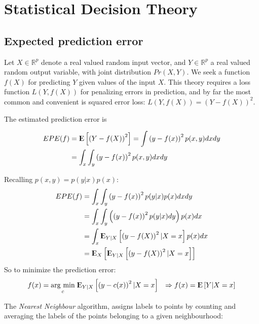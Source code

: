 \documentclass[12pt, letterpaper]{article}
\theoremstyle{definition}
\newcommand{\R}{\mathbb{R}}
\newcommand{\E}{{\rm I\kern-.3em E}}
\newcommand{\argmin}[1]{\underset{#1}{\operatorname{arg}\,\operatorname{min}}\;}
\begin{document}
\section{Statistical Decision Theory}
\subsection{Expected prediction error}
Let $X \in \R^p$ denote a real valued random input vector, and $Y \in \R^p$ a real valued random output variable, with joint distribution $Pr(X,Y)$. We seek a function $f(X)$ for predicting $Y$ given values of the input $X$. This theory requires a loss function $L(Y,f(X))$ for penalizing errors in prediction, and by far the most common and convenient is 
squared error loss: $L(Y,f(X))=(Y -f(X))^2$.

The estimated prediction error is 

\begin{equation}
\begin{aligned}
EPE(f) &= \E\left[ \left( Y- f(X) \right)^2 \right] = \int \left( y- f(x) \right)^2 p(x,y) dx dy \\
&= \int_x\int_y \left( y- f(x) \right)^2 p(x,y) dx dy \\
\end{aligned}
\end{equation}

Recalling $p(x,y) = p( y|x) p(x)$:
\begin{equation}
\begin{aligned}
EPE(f) &= \int_x\int_y \left( y- f(x) \right)^2 p(y|x)  p(x) dx dy \\
 &= \int_x \int_y \left( \left( y - f(x) \right)^2 p(y|x) dy\right)  p(x) dx   \\
 &= \int_x \E_{Y|X} \left[ \left( y - f(X) \right)^2 | X=x \right]  p(x) dx   \\
 &= \E_X \left[ \E_{Y|X} \left[ \left( y - f(X) \right)^2 | X=x \right]    \right]   
\end{aligned}
\end{equation}
So to minimize the prediction error:
\begin{align}
f(x) &= \argmin{c} \E_{Y|X} \left[ \left( y - c(x) \right)^2 | X=x \right] 
& \Rightarrow f(x) = \E \left[ Y | X=x \right] 
\end{align}

The \textit{Nearest Neighbour} algorithm, assigns labels to points by counting and averaging the labels of the points belonging to a given neighbourhood:
\end{document}
